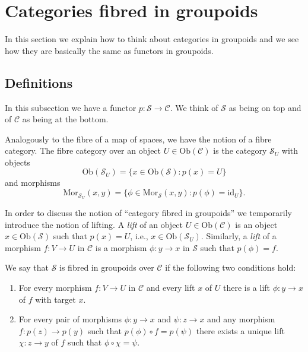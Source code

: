\section{Categories fibred in groupoids}
\label{subsection-fibred-groupoids}

\noindent
In this section we explain how to think about categories in groupoids and
we see how they are basically the same as functors in groupoids.

\subsection{Definitions}
\label{subsection-categories-groupoids-definition}

\noindent
In this subsection we have a functor $p : \mathcal{S} \to \mathcal{C}$.
We think of $\mathcal{S}$ as being on top and of $\mathcal{C}$ as being
at the bottom.

\smallskip\noindent
Analogously to the fibre of a map of spaces, we have the notion of a 
fibre category. The fibre category over an object 
$U\in \text{Ob}(\mathcal{C})$ is the category $\mathcal{S}_U$ with 
objects
$$
\text{Ob}(\mathcal{S}_U) = \{x\in \text{Ob}(\mathcal{S}) :
p(x)=U\}
$$
and morphisms 
$$
\text{Mor}_{\mathcal{S}_U}(x,y) = \{ \phi \in \text{Mor}_\mathcal{S}(x,y) :
p(\phi) = \text{id}_U\}.
$$

\smallskip\noindent
In order to discuss the notion of ``category fibred in groupoids'' we
temporarily introduce the notion of lifting.
A {\it lift} of an object $U \in \text{Ob}(\mathcal{C})$ is an object 
$x\in \text{Ob}(\mathcal{S})$ such that $p(x)=U$, i.e., 
$x\in \text{Ob}(\mathcal{S}_U)$.  
Similarly, a {\it lift} of a morphism $f : V \to U$ in $\mathcal{C}$ is a 
morphism $\phi : y \to x$ in $\mathcal{S}$ such that $p(\phi)=f$.

\begin{definition}
\label{definition-fibred-groupoids}
We say that $\mathcal{S}$ is fibred in groupoids over $\mathcal{C}$ if
the following two conditions hold:
\begin{enumerate}
\item For every morphism $f : V \to U$ in $\mathcal{C}$ and every
lift $x$ of $U$ there is a lift $\phi : y \to x$ of $f$ with
target $x$.
\item For every pair of morphisms $ \phi : y \to x$ and $ \psi : z \to x$
and any morphism $ f : p(z) \to p(y)$ such that $ p(\phi) \circ f = 
p(\psi)$ there exists a unique lift $ \chi : z \to y$ of $f$ such that
$\phi \circ \chi = \psi$.
\end{enumerate}
\end{definition}

